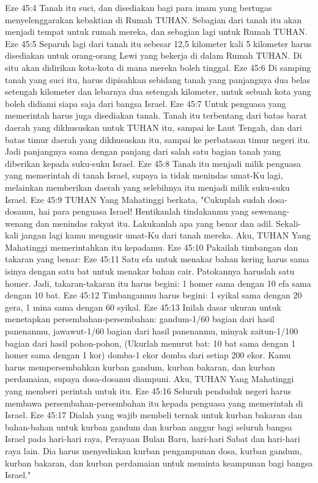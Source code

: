 Eze 45:4  Tanah itu suci, dan disediakan bagi para imam yang bertugas menyelenggarakan kebaktian di Rumah TUHAN. Sebagian dari tanah itu akan menjadi tempat untuk rumah mereka, dan sebagian lagi untuk Rumah TUHAN.
Eze 45:5  Separuh lagi dari tanah itu sebesar 12,5 kilometer kali 5 kilometer harus disediakan untuk orang-orang Lewi yang bekerja di dalam Rumah TUHAN. Di situ akan didirikan kota-kota di mana mereka boleh tinggal.
Eze 45:6  Di samping tanah yang suci itu, harus dipisahkan sebidang tanah yang panjangnya dua belas setengah kilometer dan lebarnya dua setengah kilometer, untuk sebuah kota yang boleh didiami siapa saja dari bangsa Israel.
Eze 45:7  Untuk penguasa yang memerintah harus juga disediakan tanah. Tanah itu terbentang dari batas barat daerah yang dikhususkan untuk TUHAN itu, sampai ke Laut Tengah, dan dari batas timur daerah yang dikhususkan itu, sampai ke perbatasan timur negeri itu. Jadi panjangnya sama dengan panjang dari salah satu bagian tanah yang diberikan kepada suku-suku Israel.
Eze 45:8  Tanah itu menjadi milik penguasa yang memerintah di tanah Israel, supaya ia tidak menindas umat-Ku lagi, melainkan memberikan daerah yang selebihnya itu menjadi milik suku-suku Israel.
Eze 45:9  TUHAN Yang Mahatinggi berkata, "Cukuplah sudah dosa-dosamu, hai para penguasa Israel! Hentikanlah tindakanmu yang sewenang-wenang dan menindas rakyat itu. Lakukanlah apa yang benar dan adil. Sekali-kali jangan lagi kamu mengusir umat-Ku dari tanah mereka. Aku, TUHAN Yang Mahatinggi memerintahkan itu kepadamu.
Eze 45:10  Pakailah timbangan dan takaran yang benar:
Eze 45:11  Satu efa untuk menakar bahan kering harus sama isinya dengan satu bat untuk menakar bahan cair. Patokannya haruslah satu homer. Jadi, takaran-takaran itu harus begini: 1 homer sama dengan 10 efa sama dengan 10 bat.
Eze 45:12  Timbanganmu harus begini: 1 syikal sama dengan 20 gera, 1 mina sama dengan 60 syikal.
Eze 45:13  Inilah dasar ukuran untuk menetapkan persembahan-persembahan: gandum-1/60 bagian dari hasil panenanmu, jawawut-1/60 bagian dari hasil panenanmu, minyak zaitun-1/100 bagian dari hasil pohon-pohon, (Ukurlah menurut bat: 10 bat sama dengan 1 homer sama dengan 1 kor) domba-1 ekor domba dari setiap 200 ekor. Kamu harus mempersembahkan kurban gandum, kurban bakaran, dan kurban perdamaian, supaya dosa-dosamu diampuni. Aku, TUHAN Yang Mahatinggi yang memberi perintah untuk itu.
Eze 45:16  Seluruh penduduk negeri harus membawa persembahan-persembahan itu kepada penguasa yang memerintah di Israel.
Eze 45:17  Dialah yang wajib membeli ternak untuk kurban bakaran dan bahan-bahan untuk kurban gandum dan kurban anggur bagi seluruh bangsa Israel pada hari-hari raya, Perayaan Bulan Baru, hari-hari Sabat dan hari-hari raya lain. Dia harus menyediakan kurban pengampunan dosa, kurban gandum, kurban bakaran, dan kurban perdamaian untuk meminta keampunan bagi bangsa Israel."
